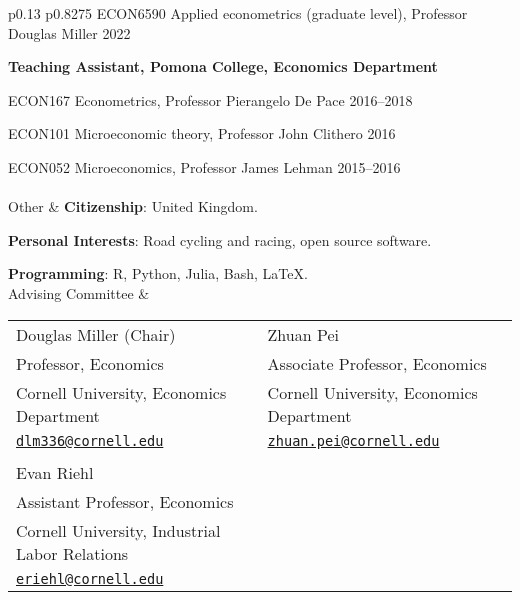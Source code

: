 \documentclass[letterpaper,11pt,oneside]{article}
\begin{document}
\begin{tabular}[\textwidth]{p{} p{}}
    ECON6590 Applied econometrics (graduate level), Professor Douglas Miller \hfill 2022

    \vspace{0.1cm}
    \textbf{Teaching Assistant, Pomona College, Economics Department}
    
    ECON167 Econometrics, Professor Pierangelo De Pace \hfill 2016--2018

    ECON101 Microeconomic theory, Professor John Clithero \hfill 2016

    ECON052 Microeconomics, Professor James Lehman \hfill 2015--2016 \\

\\[15ex]
\Large{Other}
    & \textbf{Citizenship}: United Kingdom.
    
    \textbf{Personal Interests}: Road cycling and racing, open source software.
    
    \textbf{Programming}: R, Python, Julia, Bash, \LaTeX. \vspace{0.2cm} \\

\Large{Advising Committee}
    & \begin{tabular}[t]{@{} l l}
        Douglas Miller (Chair)                   & Zhuan Pei                                \\
        Professor, Economics                     & Associate Professor, Economics           \\
        Cornell University, Economics Department & Cornell University, Economics Department \\
        \href{mailto:dlm336@cornell.edu}{\nolinkurl{dlm336@cornell.edu}}
            & \href{mailto:zhuan.pei@cornell.edu}{\nolinkurl{zhuan.pei@cornell.edu}}            \\ \\
        Evan Riehl                                     \\
        Assistant Professor, Economics                 \\
        Cornell University, Industrial Labor Relations \\
        \href{mailto:eriehl@cornell.edu}{\nolinkurl{eriehl@cornell.edu}}
    \end{tabular}
\end{tabular}

\newpage
\onehalfspacing
\restoregeometry
{}
\end{document}
